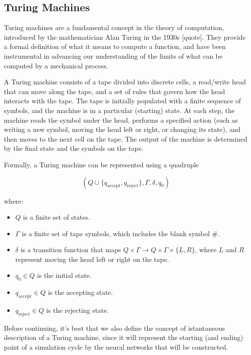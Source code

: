 \documentclass{article}
\begin{document}
\subsection{Turing Machines}

Turing machines are a fundamental concept in the theory of computation, introduced by the mathematician Alan Turing in the 1930s [quote]. They provide a formal definition of what it means to compute a function, and have been instrumental in advancing our understanding of the limits of what can be computed by a mechanical process.

A Turing machine consists of a tape divided into discrete cells, a read/write head that can move along the tape, and a set of rules that govern how the head interacts with the tape. The tape is initially populated with a finite sequence of symbols, and the machine is in a particular (starting) state. At each step, the machine reads the symbol under the head, performs a specified action (such as writing a new symbol, moving the head left or right, or changing its state), and then moves to the next cell on the tape. The output of the machine is determined by the final state and the symbols on the tape.

Formally, a Turing machine can be represented using a quadruple

\begin{equation}
(Q \cup \{q_{\mathrm{accept}}, q_{\mathrm{reject}} \}, \Gamma, \delta, q_0)
\end{equation}

where:

\begin{itemize}
    \item $Q$ is a finite set of states.
    \item $\Gamma$ is a finite set of tape symbols, which includes the blank symbol $\#$.
    \item $\delta$ is a transition function that maps $Q \times \Gamma \rightarrow Q \times \Gamma \times \{L, R\}$, where $L$ and $R$ represent moving the head left or right on the tape.
    \item $q_0 \in Q$ is the initial state.
    \item $q_{\mathrm{accept}} \in Q$ is the accepting state.
    \item $q_{\mathrm{reject}} \in Q$ is the rejecting state.
\end{itemize}

Before continuing, it's best that we also define the concept of istantaneous description of a Turing machine, since it will represent the starting (and ending) point of a simulation cycle by the neural networks that will be constructed.
\end{document}
